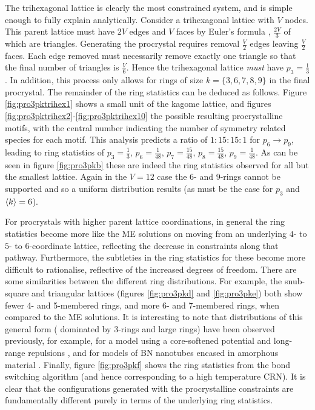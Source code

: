 The trihexagonal lattice is clearly the most constrained system, and is simple enough to fully explain analytically.
Consider a trihexagonal lattice with $V$ nodes. 
This parent lattice must have $2V$ edges and $V$ faces by Euler's formula , $\frac{2V}{3}$ of which are triangles.
Generating the procrystal requires removal $\frac{V}{2}$ edges leaving $\frac{V}{2}$ faces.
Each edge removed must necessarily remove exactly one triangle so that the final number of triangles is $\frac{V}{6}$.
Hence the trihexagonal lattice \textit{must} have $p_3=\frac{1}{3}$.
In addition, this process only allows for rings of size $k=\{3,6,7,8,9\}$ in the final procrystal.
The remainder of the ring statistics can be deduced as follows.
Figure \ref{fig:pro3pktrihex1} shows a small unit of the kagome lattice, and figures \ref{fig:pro3pktrihex2}\--\ref{fig:pro3pktrihex10} the possible resulting procrystalline motifs, with the central number indicating the number of symmetry related species for each motif. 
This analysis predicts a ratio of $1:15:15:1$ for $p_6\rightarrow p_9$, leading to ring statistics of $p_3=\frac{1}{3}$, $p_6=\frac{1}{48}$, $p_7=\frac{15}{48}$, $p_8=\frac{15}{48}$, $p_9=\frac{1}{48}$.
As can be seen in figure \ref{fig:pro3pkb} these are indeed the ring statistics observed for all but the smallest lattice.
Again in the $V=12$ case the $6$\-- and $9$\--rings cannot be supported and so a uniform distribution results (as must be the case for $p_3$ and $\langle k \rangle=6$). 

For procrystals with higher parent lattice coordinations, in general the ring statistics become more like the ME solutions on moving from an underlying $4$\-- to $5$\-- to $6$\--coordinate lattice, reflecting the decrease in constraints along that pathway.
Furthermore, the subtleties in the ring statistics for these become more difficult to rationalise, reflective of the increased degrees of freedom.
There are some similarities between the different ring distributions.
For example, the snub\--square and triangular lattices (figures \ref{fig:pro3pkd} and \ref{fig:pro3pke}) both show
fewer 4\-- and 5\--membered rings, and more 6\-- and 7\--membered rings, when compared to the ME solutions.
It is interesting to note that distributions of this general form (\ie{} dominated by 3\--rings and large rings) have been observed previously, for example, for a model using a core-softened potential and long-range repulsions \cite{Camp2003}, and for models of BN nanotubes encased in amorphous material \cite{Griebel2007}.
Finally, figure \ref{fig:pro3pkf} shows the ring statistics from the bond switching algorithm (and hence corresponding to a high temperature CRN). 
It is clear that the configurations generated with the procrystalline constraints are fundamentally different purely in terms of the underlying ring statistics.


